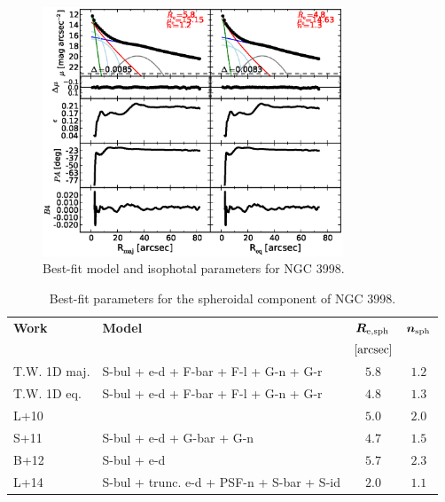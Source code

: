 \documentclass[preprint2]{emulateapj}
\newcommand{\fitfigurewidth}{0.8\textwidth}
\begin{document}
  \begin{figure}[h]
  \begin{center}
  \includegraphics[width=\fitfigurewidth]{images/n3998_1Dfit.eps}
  \caption{Best-fit model and isophotal parameters for NGC 3998.}
  \end{center}
  \end{figure}

  \begin{table}[h]
  \small
  \caption{Best-fit parameters for the spheroidal component of NGC 3998.}
  \begin{center}
  \begin{tabular}{llcc}
  \hline
  {\bf Work} & {\bf Model}   & $\bm R_{\rm e,sph}$    & $\bm n_{\rm sph}$ \\
    &  &  $[\rm arcsec]$ & \\
  \hline
  T.W. 1D maj. & S-bul + e-d + F-bar + F-l + G-n + G-r & $5.8$  &  $1.2$ \\
  T.W. 1D eq.  & S-bul + e-d + F-bar + F-l + G-n + G-r & $4.8$  &  $1.3$ \\
  \hline
  L+10         &  & $5.0$  &  $2.0$ \\
  S+11         & S-bul + e-d + G-bar + G-n & $4.7$  &  $1.5$ \\
  B+12         & S-bul + e-d & $5.7$  &  $2.3$ \\
  L+14         & S-bul + trunc. e-d + PSF-n + S-bar + S-id & $2.0$  &  $1.1$ \\
  \hline
  \end{tabular}
  \end{center}
  \label{tab:n3998}
  \end{table} 
\end{document}
